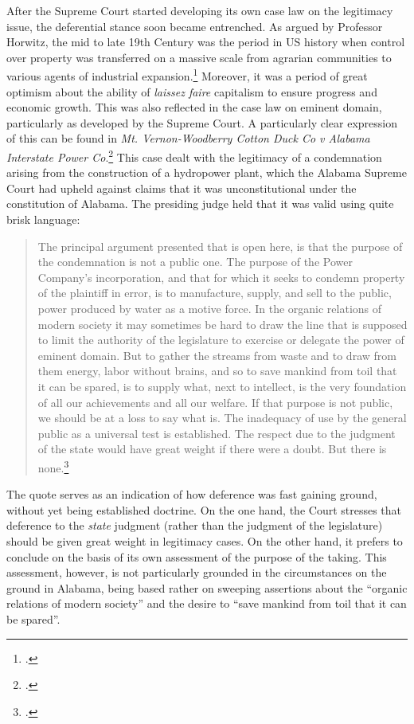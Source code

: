 \documentclass[12pt,a4paper]{book} %
\begin{document}
After the Supreme Court started developing its own case law on the legitimacy issue, the deferential stance soon became entrenched. As argued by Professor Horwitz, the mid to late 19th Century was the period in US history when control over property was transferred on a massive scale from agrarian communities to various agents of industrial expansion.\footcite{horwitz73} Moreover, it was a period of great optimism about the ability of {\it laissez faire} capitalism to ensure progress and economic growth. This was also reflected in the case law on eminent domain, particularly as developed by the Supreme Court. A particularly clear expression of this can be found in {\it Mt. Vernon-Woodberry Cotton Duck Co v Alabama Interstate Power Co}.\footcite{vernon16}  This case dealt with the legitimacy of a condemnation arising from the construction of a hydropower plant, which the Alabama Supreme Court had upheld against claims that it was unconstitutional under the constitution of Alabama. The presiding judge held that it was valid using quite brisk language:

\begin{quote}The principal argument presented that is open here, is that the purpose of the condemnation is not a public one. The purpose of the Power Company's incorporation, and that for which it seeks to condemn property of the plaintiff in error, is to manufacture, supply, and sell to the public, power produced by water as a motive force. In the organic relations of modern society it may sometimes be hard to draw the line that is supposed to limit the authority of the legislature to exercise or delegate the power of eminent domain. But to gather the streams from waste and to draw from them energy, labor without brains, and so to save mankind from toil that it can be spared, is to supply what, next to intellect, is the very foundation of all our achievements and all our welfare. If that purpose is not public, we should be at a loss to say what is. The inadequacy of use by the general public as a universal test is established. The respect due to the judgment of the state would have great weight if there were a doubt. But there is none.\footcite[]{vernon16}
\end{quote}

The quote serves as an indication of how deference was fast gaining ground, without yet being established doctrine. On the one hand, the Court stresses that deference to the {\it state} judgment (rather than the judgment of the legislature) should be given great weight in legitimacy cases. On the other hand, it prefers to conclude on the basis of its own assessment of the purpose of the taking. This assessment, however, is not particularly grounded in the circumstances on the ground in Alabama, being based rather on sweeping assertions about the ``organic relations of modern society'' and the desire to ``save mankind from toil that it can be spared''. 
\end{document}
